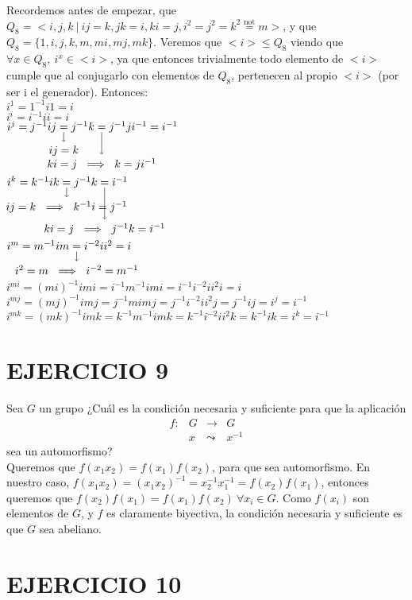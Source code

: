 \documentclass{article}
\newcommand{\nota}[3][2ex]{
    \underset{\mathclap{
        \begin{tikzpicture}
          \draw[<-] (0, 0) to ++(0,#1);
          \node[below] at (0,0) {#3};
        \end{tikzpicture}}}{#2}
}
\begin{document}
Recordemos antes de empezar, que $Q_8 = <i, j, k \ | \ ij = k, jk = i, ki = j, i^2 = j^2 = k^2 \overset{\text{not}}{=} m>$, y que $Q_8 = \{1, i, j, k, m, mi, mj, mk\}$. Veremos que $<i> \leqslant Q_8$ viendo que $\forall x \in Q_8, \ i^x \in <i>$, ya que entonces trivialmente todo elemento de $<i>$ cumple que al conjugarlo con elementos de $Q_8$, pertenecen al propio $<i>$ (por ser i el generador). Entonces:\\
$i^1 = 1^{-1}i1 = i$ \\
$i^{i} = i^{-1}ii = i$ \\
$i^j = j^{-1}ij \nota{=}{$ij = k$} j^{-1}k \nota[0.7cm]{=}{$ki = j \ \implies \ k = ji^{-1}$} j^{-1}ji^{-1} = i^{-1} $\\
$i^k = k^{-1}ik \nota{=}{$ij = k \ \implies \ k^{-1}i = j^{-1}$} j^{-1}k \nota[1cm]{=}{$ki = j \ \implies \ j^{-1}k = i^{-1}$} i^{-1}$ \\
$i^m = m^{-1}im \nota{=}{$i^2 = m \ \implies \ i^{-2} = m^{-1}$} i^{-2}ii^2 = i$\\
$i^{mi} = (mi)^{-1}imi = i^{-1}m^{-1}imi = i^{-1}i^{-2}ii^2i = i$\\
$i^{mj} = (mj)^{-1}imj = j^{-1}mimj = j^{-1}i^{-2}ii^2j = j^{-1}ij = i^j = i^{-1} $\\
$i^{mk} = (mk)^{-1}imk = k^{-1}m^{-1}imk = k^{-1}i^{-2}ii^2k = k^{-1}ik = i^k = i^{-1} $\\

\section*{EJERCICIO 9}

Sea $G$ un grupo ¿Cuál es la condición necesaria y suficiente para que la aplicación $$
\begin{array}{cccc}
  f: & G & \longrightarrow & G \\
     & x & \leadsto & x^{-1}
\end{array}  
$$ sea un automorfismo?\\

Queremos que $f(x_1x_2) = f(x_1)f(x_2)$, para que sea automorfismo. En nuestro caso, $f(x_1x_2) = (x_1x_2)^{-1} = x_2^{-1}x_1^{-1} = f(x_2)f(x_1)$, entonces queremos que $f(x_2)f(x_1) = f(x_1)f(x_2) \ \forall x_i \in G$. Como $f(x_i)$ son elementos de $G$, y $f$ es claramente biyectiva, la condición necesaria y suficiente es que $G$ sea abeliano.\\

\section*{EJERCICIO 10}
\end{document}
